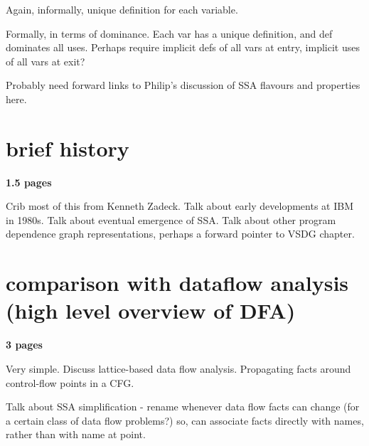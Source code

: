 Again, informally, unique definition for each variable.

Formally, in terms of dominance. Each var has a unique
definition, and def dominates all uses.
Perhaps require implicit defs of all vars at entry,
implicit uses of all vars at exit?

Probably need forward links to Philip's discussion of
SSA flavours and properties here.


\section{brief history}

\textbf{1.5 pages}

Crib most of this from Kenneth Zadeck. 
Talk about early developments at IBM in 1980s.
Talk about eventual emergence of SSA.
Talk about other program dependence graph
representations, perhaps a forward pointer to 
VSDG chapter.



\section{comparison with dataflow analysis (high level overview of DFA)}

\textbf{3 pages}

Very simple. Discuss lattice-based data flow analysis.
Propagating facts around control-flow points in a CFG.

Talk about SSA simplification - rename whenever data flow
facts can change (for a certain class of data flow problems?)
so, can associate facts directly with names, rather than with
name at point.


